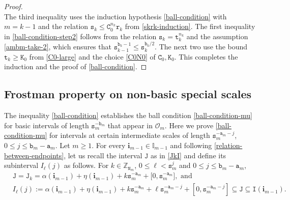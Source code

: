 \documentclass[12pt, twoside]{article}
\theoremstyle{definition}
\numberwithin{equation}{section}
\begin{document}
\begin{proof}
\begin{equation}
	\end{equation}
	The third inequality uses the induction hypothesis \eqref{ball-condition} with $m = k-1$ and the relation $\mathtt s_k \leq \mathtt C_0^{n_k} \mathtt r_k$ from \eqref{skrk-induction}. The first inequality in \eqref{ball-condition-step2} follows from the relation {$\mathtt s_k = \mathtt t_k^{n_k}$} and the assumption \eqref{ambm-take-2}, which ensures that $\mathtt s_{k-1}^{\mathtt b_{k}-1} \leq \mathtt s_{k}^{\mathtt b_{k}/2}$. The next two use the bound {$\mathtt t_k \geq \mathtt K_0$} from \eqref{C0-large} and the choice \eqref{C0N0} of $\mathtt C_0, \mathtt K_0$. This completes the induction and the proof of \eqref{ball-condition}.      
\end{proof} 
\subsection{Frostman property on non-basic special scales} \label{Frostman-special-scales-section} 
The inequality \eqref{ball-condition} establishes the ball condition \eqref{ball-condition-mu} for basic intervals of length $\mathtt s_m^{-\mathtt b_m}$  that appear in $\mathscr{O}_m$. Here we prove \eqref{ball-condition-mu} for intervals at certain intermediate scales of length $\mathtt s_m^{-\mathtt a_m-j}$, $0 \leq j \leq \mathtt b_m - \mathtt a_m$.   
\vskip0.1in 
\noindent Let $m \geq 1$. 
For every $\mathbf i_{m-1} \in \mathbb I_{m-1}$ and following \eqref{relation-between-endpoints}, let us recall the interval $\mathtt J$ as in \eqref{JkI} and define its subinterval ${I}_{\ell}(j)$ as follows. For $k \in \mathbb Z_{\mathtt N_m}$, $0 \leq \ell < \mathtt s_m^j$ and $0\leq j \leq \mathtt b_m-\mathtt a_m$,
\begin{align} 
	&\mathtt J = \mathtt J_k = \alpha(\mathbf i_{m-1})+ \eta(\mathbf i_{m-1}) + {k}{\mathtt s_m^{-\mathtt a_m}} + \bigl[0, \mathtt s_m^{-\mathtt a_m}\bigr], \text{ and }  \nonumber\\  
	&I_{\ell}(j) := \alpha (\mathbf i_{m-1}) + \eta (\mathbf i_{m-1}) + k \mathtt s_{m}^{-\mathtt a_m } + \ell \mathtt s_m^{-\mathtt a_m - j} + \left[0, \mathtt s_m^{-\mathtt a_m-j} \right] \subseteq \mathtt J \subseteq \mathtt I(\mathbf i_{m-1}). \label{def-Ilj}
\end{align}
\end{document}
